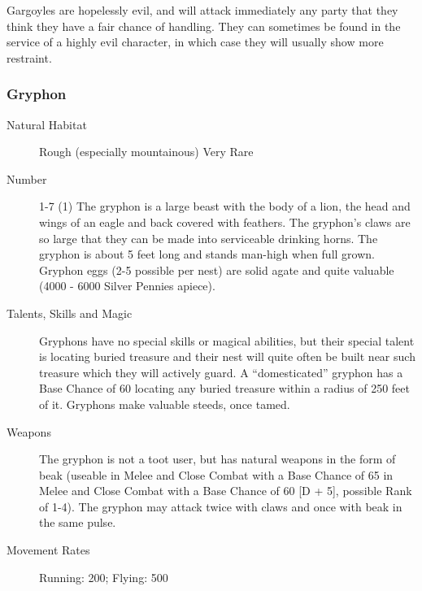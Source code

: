 \begin{multicols}{2}
\begin{description}
\setlength\itemsep{0pt}

\item[Comments] Gargoyles are hopelessly evil, and will attack immediately
any party that they think they have a fair chance of handling. They
can sometimes be found in the service of a highly evil character, in
which case they will usually show more restraint.

\end{description}

\subsubsection{Gryphon}

\begin{description}
\item[Natural Habitat] Rough (especially mountainous) Very Rare

\item[Number] 1-7 (1)
 The gryphon is a large beast with the body of a lion, the head
and wings of an eagle and back covered with feathers. The gryphon's
claws are so large that they can be made into serviceable drinking
horns. The gryphon is about 5 feet long and stands man-high when full
grown. Gryphon eggs (2-5 possible per nest) are solid agate and quite
valuable (4000 - 6000 Silver Pennies apiece).

\item[Talents, Skills and Magic] Gryphons have no special skills or magical abilities, but
their special talent is locating buried treasure and their nest will
quite often be built near such treasure which they will actively
guard. A ``domesticated'' gryphon has a Base Chance of 60%
locating any buried treasure within a radius of 250 feet of
it. Gryphons make valuable steeds, once tamed.

\item[Weapons] The gryphon is not a toot user, but has natural weapons in
the form of beak (useable in Melee and Close Combat with a Base Chance
of 65%
in Melee and Close Combat with a Base Chance of 60%
[D + 5], possible Rank of 1-4). The gryphon may attack twice with
claws and once with beak in the same pulse.


\item[Movement Rates] Running: 200; Flying: 500


\end{description}
\end{multicols}
